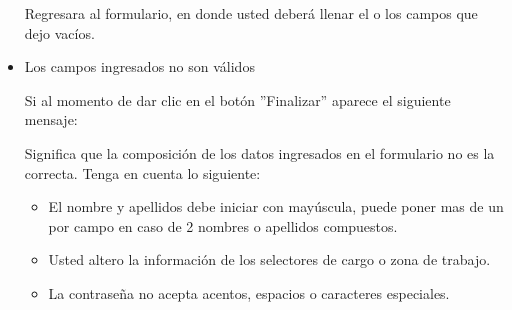 \begin{itemize}
                           Regresara  al formulario, en donde usted deberá llenar el o los campos que dejo vacíos. 
                
                        \item Los campos ingresados no son válidos
                        
                            Si al momento de dar clic en el botón ''Finalizar'' aparece el siguiente mensaje:
                            
                            Significa que la composición de los datos ingresados en el formulario no es la correcta. Tenga en cuenta lo siguiente:
                            
                            \begin{itemize}
                            	\item El nombre y apellidos debe iniciar con mayúscula, puede poner mas de un por campo en caso de 2 nombres o apellidos compuestos.
                            	\item Usted altero la información de los selectores de cargo o zona de trabajo.
                            	\item La contraseña no acepta acentos, espacios o caracteres especiales.
                            \end{itemize}
                        
                        
                    
                    \end{itemize}